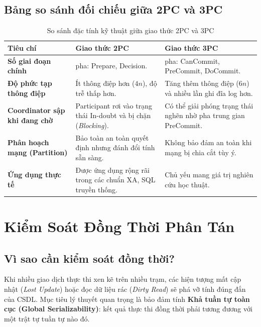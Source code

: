 \documentclass[12pt,a4paper]{report}
\begin{document}
\subsection{Bảng so sánh đối chiếu giữa 2PC và 3PC}

\begin{table}[!ht]
\centering
\small
\caption{So sánh đặc tính kỹ thuật giữa giao thức 2PC và 3PC}
\label{tab:2pc_vs_3pc}
\renewcommand{\arraystretch}{1.25}
\begin{tabularx}{\textwidth}{|>{\raggedright\arraybackslash\bfseries}p{3.2cm}|>{\raggedright\arraybackslash}X|>{\raggedright\arraybackslash}X|}
\hline
\textbf{Tiêu chí} & \textbf{Giao thức 2PC} & \textbf{Giao thức 3PC} \\ \hline
Số giai đoạn chính & 2 pha: Prepare, Decision. & 3 pha: CanCommit, PreCommit, DoCommit. \\ \hline
Độ phức tạp thông điệp & Ít thông điệp hơn ($4n$), độ trễ thấp hơn. & Tăng thêm thông điệp ($6n$) và nhiều lần ghi đĩa log hơn. \\ \hline
Coordinator sập khi đang chờ & Participant rơi vào trạng thái In-doubt và bị chặn (\textit{Blocking}). & Có thể giải phóng trạng thái nghẽn nhờ pha trung gian PreCommit. \\ \hline
Phân hoạch mạng (Partition) & Bảo toàn an toàn quyết định nhưng đánh đổi tính sẵn sàng. & Không bảo đảm an toàn khi mạng bị chia cắt tùy ý. \\ \hline
Ứng dụng thực tế & Được ứng dụng rộng rãi trong các chuẩn XA, SQL truyền thống. & Chủ yếu mang giá trị nghiên cứu học thuật. \\ \hline
\end{tabularx}
\end{table}

\section{Kiểm Soát Đồng Thời Phân Tán}

\subsection{Vì sao cần kiểm soát đồng thời?}
Khi nhiều giao dịch thực thi xen kẽ trên nhiều trạm, các hiện tượng mất cập nhật (\textit{Lost Update}) hoặc đọc dữ liệu rác (\textit{Dirty Read}) sẽ phá vỡ tính đúng đắn của CSDL. Mục tiêu lý thuyết quan trọng là bảo đảm tính \textbf{Khả tuần tự toàn cục (Global Serializability)}: kết quả thực thi đồng thời phải tương đương với một trật tự tuần tự nào đó.
\end{document}
